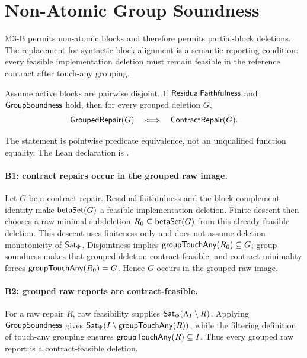 \section{Non-Atomic Group Soundness}
\label{sec:group-soundness}

M3-B permits non-atomic blocks and therefore permits partial-block deletions.
The replacement for syntactic block alignment is a semantic reporting
condition: every feasible implementation deletion must remain feasible in the
reference contract after touch-any grouping.

\begin{theorem}
\label{thm:m3b}
Assume active blocks are pairwise disjoint.  If
\(\mathsf{ResidualFaithfulness}\) and \(\mathsf{GroupSoundness}\) hold, then for every grouped
deletion \(G\),
\[
  \mathsf{GroupedRepair}(G)
  \quad\Longleftrightarrow\quad
  \mathsf{ContractRepair}(G).
\]
\end{theorem}

The statement is pointwise predicate equivalence, not an unqualified function
equality.  The Lean declaration is .

\paragraph{B1: contract repairs occur in the grouped raw image.}
Let \(G\) be a contract repair.  Residual faithfulness and the block-complement
identity make \(\mathsf{betaSet}(G)\) a feasible implementation deletion.  Finite
descent then chooses a raw minimal subdeletion
\(R_0\subseteq\mathsf{betaSet}(G)\) from this already feasible deletion.  This descent
uses finiteness only and does not assume deletion-monotonicity of \(\mathsf{Sat}_{\Phi}\).
Disjointness implies
\(\mathsf{groupTouchAny}(R_0)\subseteq G\); group soundness makes that grouped deletion
contract-feasible; and contract minimality forces
\(\mathsf{groupTouchAny}(R_0)=G\).  Hence \(G\) occurs in the grouped raw image.

\paragraph{B2: grouped raw reports are contract-feasible.}
For a raw repair \(R\), raw feasibility supplies
\(\mathsf{Sat}_{\Phi}(\Lambda_I\setminus R)\).  Applying \(\mathsf{GroupSoundness}\) gives
\(\mathsf{Sat}_{\Psi}(I\setminus\mathsf{groupTouchAny}(R))\), while the filtering definition of
touch-any grouping ensures \(\mathsf{groupTouchAny}(R)\subseteq I\).  Thus every
grouped raw report is a contract-feasible deletion.

